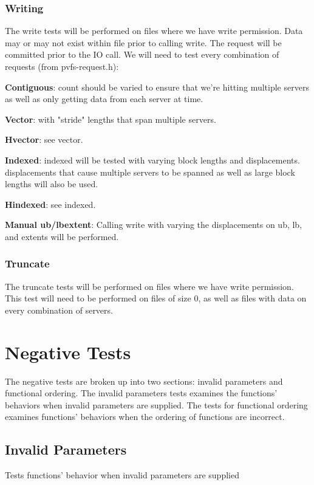 \documentclass[12pt]{article} %
\begin{document}
\subsubsection{Writing}
The write tests will be performed on files where we have write permission.  Data may or may not exist within file prior to calling write.  The request will be committed prior to the IO call.  We will need to test every combination of requests (from pvfs-request.h):

\begin{list}{.}{}
\item \textbf{Contiguous}:  count should be varied to ensure that we're hitting multiple servers as well as only getting data from each server at time.
\item \textbf{Vector}: with "stride" lengths that span multiple servers.
\item \textbf{Hvector}:  see vector.
\item \textbf{Indexed}:  indexed will be tested with varying block lengths and displacements.  displacements that cause multiple servers to be spanned as well as large block lengths will also be used.
\item \textbf{Hindexed}:  see indexed.
\item \textbf{Manual ub/lbextent}:  Calling write with varying the displacements on ub, lb, and extents will be performed.
\end{list}

\subsubsection{Truncate}
The truncate tests will be performed on files where we have write permission.  This test will need to be performed on files of size 0, as well as files with data on every combination of servers.

\section{Negative Tests}
The negative tests are broken up into two sections: invalid parameters and functional ordering.  The invalid parameters tests examines the functions' behaviors when invalid parameters are supplied.  The tests for functional ordering examines functions' behaviors when the ordering of functions are incorrect.

\subsection{Invalid Parameters}
Tests functions' behavior when invalid parameters are supplied
\end{document}
